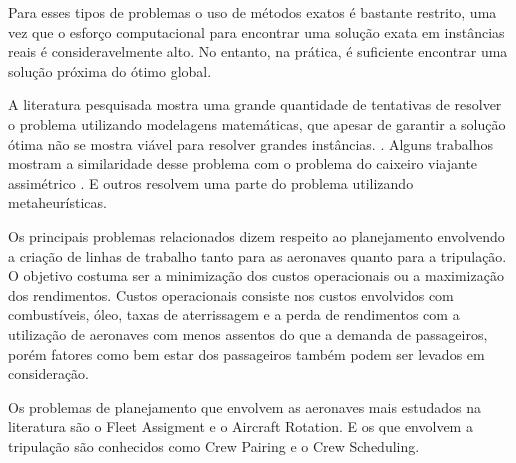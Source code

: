 Para esses tipos de problemas o uso de métodos exatos é bastante restrito, uma vez que o esforço computacional para encontrar uma solução exata em instâncias reais é consideravelmente alto. No entanto, na prática, é suficiente encontrar uma solução próxima do ótimo global. 

A literatura pesquisada mostra uma grande quantidade de tentativas de resolver o problema utilizando modelagens matemáticas, que apesar de garantir a solução ótima não se mostra viável para resolver grandes instâncias. \citep{clarke97}. Alguns trabalhos mostram a similaridade desse problema com o problema do caixeiro viajante assimétrico \cite{clarke97}. E outros resolvem uma parte do problema utilizando metaheurísticas.\citep{arguelo1007}

Os principais problemas relacionados dizem respeito ao planejamento envolvendo a criação de linhas de trabalho tanto para as aeronaves quanto para a tripulação. O objetivo costuma ser a minimização dos custos operacionais ou a maximização dos rendimentos. Custos operacionais consiste nos custos envolvidos com combustíveis, óleo, taxas de aterrissagem e a perda de rendimentos com a utilização de aeronaves com menos assentos do que a demanda de passageiros, porém fatores como bem estar dos passageiros também podem ser levados em consideração.

	Os problemas de planejamento que envolvem as aeronaves mais estudados na literatura são o Fleet Assigment e o Aircraft Rotation. E os que envolvem a tripulação são conhecidos como Crew Pairing e o Crew Scheduling.

